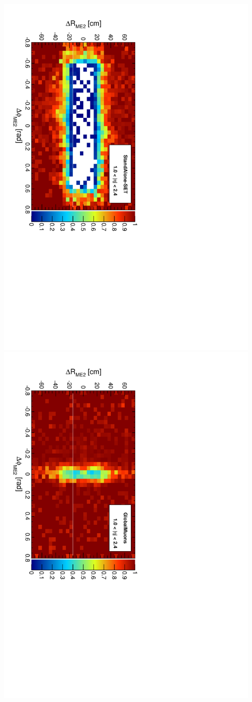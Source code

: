 \documentclass[compress]{beamer}
\begin{document}
\begin{frame}
\begin{center}
\includegraphics[height=0.45\linewidth, angle=90]{me2_StandAloneUpdatedSET.pdf}
\includegraphics[height=0.45\linewidth, angle=90]{me2_GlobalMuons.pdf}
\end{center}
\end{frame}
\end{document}
